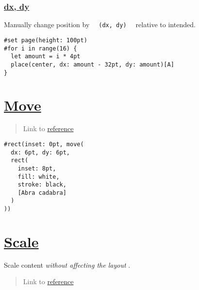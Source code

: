 \pandocbounded{}

\pandocbounded{}

\subsubsection{\texorpdfstring{\hyperref[dx-dy]{dx,
dy}}{dx, dy}}\label{dx-dy}

Manually change position by
\texttt{\ }{\texttt{\ (dx,\ dy)\ }}\texttt{\ } relative to intended.

\begin{verbatim}
#set page(height: 100pt)
#for i in range(16) {
  let amount = i * 4pt
  place(center, dx: amount - 32pt, dy: amount)[A]
}
\end{verbatim}

\pandocbounded{}

\section{\texorpdfstring{\hyperref[move]{Move}}{Move}}\label{move}

\begin{quote}
Link to \href{https://typst.app/docs/reference/layout/move/}{reference}
\end{quote}

\begin{verbatim}
#rect(inset: 0pt, move(
  dx: 6pt, dy: 6pt,
  rect(
    inset: 8pt,
    fill: white,
    stroke: black,
    [Abra cadabra]
  )
))
\end{verbatim}

\pandocbounded{}

\section{\texorpdfstring{\hyperref[scale]{Scale}}{Scale}}\label{scale}

Scale content \emph{without affecting the layout} .

\begin{quote}
Link to \href{https://typst.app/docs/reference/layout/scale/}{reference}
\end{quote}

